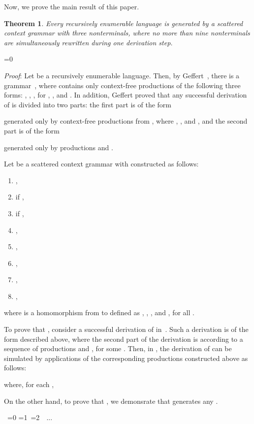 \documentclass[copyright]{eptcs}
\makeatletter
\newtheorem{theorem}{Theorem}
\newcounter{d@proof}\let\thed@proof\relax\setcounter{d@proof}{0}
\newcommand*{\qed}{}
\newenvironment{proof}{\ifnum \value{d@proof}=0{\setcounter{claim}{0}}\else\fi
  \stepcounter{d@proof}\par\noindent
  {\rmfamily\itshape\mdseries Proof\/}:\hspace{\labelsep}\ignorespaces}{\addtocounter{d@proof}{-1}\mbox{}\nolinebreak\hfill~\ifnum \value{d@proof}=0{\qed}\else
    \ifnum \value{d@proof}=1{\qed\nolinebreak\,\nolinebreak\qed}\else
      \ifnum \value{d@proof}=2{\qed\nolinebreak\,\nolinebreak\qed
          \nolinebreak\,\nolinebreak\qed}\else
        {\qed\nolinebreak...\nolinebreak\qed}\fi\fi\fi
  \medbreak
}
\makeatother
\begin{document}
  Now, we prove the main result of this paper.

  \begin{theorem}
    Every recursively enumerable language is generated by a scattered context grammar with three nonterminals, where no more than nine nonterminals are simultaneously rewritten during one derivation step.
  \end{theorem}
  \begin{proof}
    Let  be a recursively enumerable language. Then, by Geffert~\cite{Geffert:1988}, 
    there is a grammar\linebreak \hbox{ }, 
    where  contains only context-free productions of the following three forms: 
    , , , for , , 
    and . In addition, Geffert proved that any successful derivation of  is 
    divided into two parts: the first part is of the form 
     
    generated only by context-free productions from , where , 
    , and , and the second part is of the form 
     
    generated only by productions  and .

    Let  be a scattered context grammar with  constructed as follows:
    \begin{enumerate}
      \item\label{genS} ,
      \item\label{a2}  \qquad if ,
      \item\label{a3}  \qquad if ,
      \item\label{a4} ,
      \item\label{a5} ,
      \item\label{a6} ,
      \item\label{a7} ,
      \item\label{remS} ,
    \end{enumerate}
    where  is a homomorphism from  to  defined as , , , and , for all .

    To prove that , consider a successful derivation of  
    in~. Such a derivation is of the form described above, where the second part of the derivation is according to a sequence  of productions  and , for some . Then, in , the derivation of  can be simulated by applications of the corresponding productions constructed above as follows:
    
    where, for each ,
    


    On the other hand, to prove that , we demonsrate that  generates any .


\end{proof}
\end{document}
